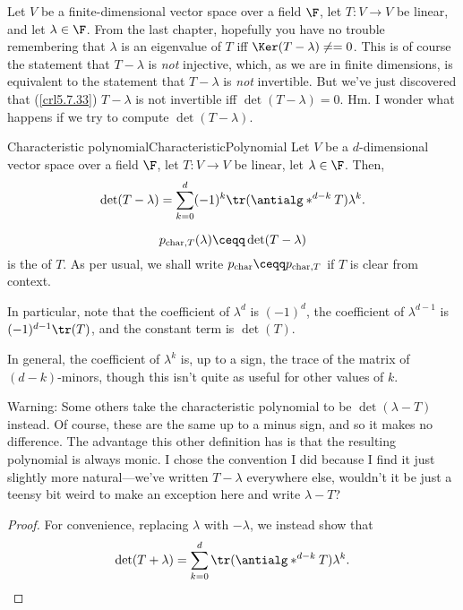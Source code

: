 Let $V$ be a finite-dimensional vector space over a field $\F$, let $T\colon V\rightarrow V$ be linear, and let $\lambda \in \F$.  From the last chapter, hopefully you have no trouble remembering that $\lambda$ is an eigenvalue of $T$ iff $\Ker (T-\lambda )\neq =0$.  This is of course the statement that $T-\lambda$ is \emph{not} injective, which, as we are in finite dimensions, is equivalent to the statement that $T-\lambda$ is \emph{not} invertible.  But we've just discovered that (\cref{crl5.7.33}) $T-\lambda$ is not invertible iff $\det (T-\lambda )=0$.  Hm.  I wonder what happens if we try to compute $\det (T-\lambda )$.
\begin{thm}{Characteristic polynomial}{CharacteristicPolynomial}
	Let $V$ be a $d$-dimensional vector space over a field $\F$, let $T\colon V\rightarrow V$ be linear, let $\lambda \in \F$.  Then,
	\begin{equation}
		\det (T-\lambda )=\sum _{k=0}^d(-1)^k\tr (\antialg* ^{d-k}T)\lambda ^k.
	\end{equation}
	\begin{rmk}
		\begin{equation}
			p_{\operatorname{char},T}(\lambda )\ceqq \det (T-\lambda )
		\end{equation}
		is the  of $T$.  As per usual, we shall write $p_{\operatorname{char}}\ceqq p_{\operatorname{char},T}$ if $T$ is clear from context.
	\end{rmk}
	\begin{rmk}
		In particular, note that the coefficient of $\lambda ^d$ is $(-1)^d$, the coefficient of $\lambda ^{d-1}$ is $(-1)^{d-1}\tr (T)$, and the constant term is $\det (T)$.
		
		In general, the coefficient of $\lambda ^k$ is, up to a sign, the trace of the matrix of $(d-k)$-minors, though this isn't quite as useful for other values of $k$.
	\end{rmk}
	\begin{rmk}
		Warning:  Some others take the characteristic polynomial to be $\det (\lambda -T)$ instead.  Of course, these are the same up to a minus sign, and so it makes no difference.  The advantage this other definition has is that the resulting polynomial is always monic.  I chose the convention I did because I find it just slightly more natural---we've written $T-\lambda$ everywhere else, wouldn't it be just a teensy bit weird to make an exception here and write $\lambda -T$?
	\end{rmk}
	\begin{proof}
		For convenience, replacing $\lambda$ with $-\lambda$, we instead show that
		\begin{equation}
			\det (T+\lambda )=\sum _{k=0}^d\tr (\antialg* ^{d-k}T)\lambda ^k.
		\end{equation}
		

\end{proof}
\end{thm}
